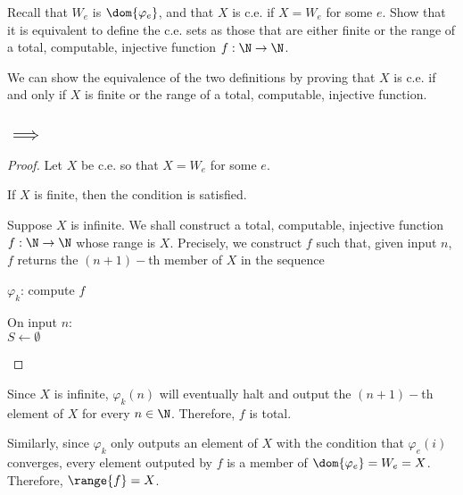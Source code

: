 \begin{problem}[2]
  Recall that $W_e$ is $\dom{\varphi_e}$, and that $X$ is c.e. if
  $X = W_e$ for some $e$. Show that it is equivalent to define
  the c.e. sets as those that are either finite or the range
  of a total, computable, injective function
  $f : \N \to \N$.

  \begin{answer}
    We can show the equivalence of the two definitions by proving that
    $X$ is c.e. if and only if $X$ is finite or the range of a
    total, computable, injective function.

    \subsection*{$\implies$}
      \begin{proof}
        Let $X$ be c.e. so that $X = W_e$ for some $e$.

        \step
        If $X$ is finite, then the condition is satisfied.

        \step
        Suppose $X$ is infinite.
        We shall construct a total, computable, injective function
        $f : \N \to \N$ whose range is $X$.
        Precisely, we construct $f$ such that, given input $n$,
        $f$ returns the $(n+1)-$th member of $X$ in the sequence

        \step
        \begin{algorithm}[H]
          \caption{$\varphi_k$: compute $f$}
          On input $n$: \\
          $S \gets \emptyset$ \\
        \end{algorithm}
      \end{proof}

      Since $X$ is infinite, $\varphi_k(n)$
      will eventually halt and output the $(n+1)-$th element of $X$
      for every $n \in \N$.
      Therefore, $f$ is total.

      Similarly, since $\varphi_k$ only outputs an element
      of $X$ with the condition that $\varphi_e(i)$ converges,
      every element outputed by $f$ is a member of
      $\dom{\varphi_e} = W_e = X$. Therefore, $\range{f} = X$.


\end{answer}
\end{problem}
